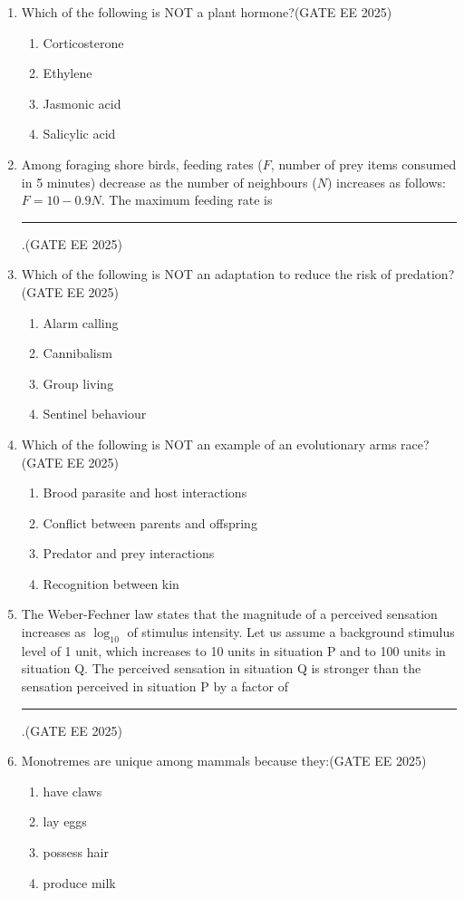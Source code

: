\begin{enumerate}[leftmargin=*,label=\textbf{Q.\arabic*},resume]
\item Which of the following is NOT a plant hormone?\hfill {(GATE EE 2025)}
\begin{enumerate}
\item Corticosterone
\item Ethylene
\item Jasmonic acid
\item Salicylic acid
\end{enumerate}

\item Among foraging shore birds, feeding rates ($F$, number of prey items consumed in 5 minutes) decrease as the number of neighbours ($N$) increases as follows: $F = 10 - 0.9 N$. The maximum feeding rate is \rule{2cm}{0.15mm}.\hfill {(GATE EE 2025)}

\item Which of the following is NOT an adaptation to reduce the risk of predation?\hfill {(GATE EE 2025)}
\begin{enumerate}
\item Alarm calling
\item Cannibalism
\item Group living
\item Sentinel behaviour
\end{enumerate}

\item Which of the following is NOT an example of an evolutionary arms race?\hfill {(GATE EE 2025)}
\begin{enumerate}
\item Brood parasite and host interactions
\item Conflict between parents and offspring
\item Predator and prey interactions
\item Recognition between kin
\end{enumerate}

\item The Weber-Fechner law states that the magnitude of a perceived sensation increases as $\log_{10}$ of stimulus intensity. Let us assume a background stimulus level of 1 unit, which increases to 10 units in situation P and to 100 units in situation Q. The perceived sensation in situation Q is stronger than the sensation perceived in situation P by a factor of \rule{2cm}{0.15mm}.\hfill {(GATE EE 2025)}

\item Monotremes are unique among mammals because they:\hfill {(GATE EE 2025)}
\begin{multicols}{2}
\begin{enumerate}
\item have claws
\item lay eggs
\item possess hair
\item produce milk
\end{enumerate}
\end{multicols}
\end{enumerate}
